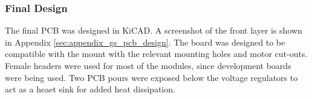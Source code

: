 \subsubsection{Final Design}
The final PCB was designed in KiCAD. A screenshot of the front layer is shown in Appendix \ref{sec:appendix_gs_pcb_design}. The board was designed to be compatible with the mount with the relevant mounting holes and motor cut-outs. Female headers were used for most of the modules, since development boards were being used. Two PCB pours were exposed below the voltage regulators to act as a heaet sink for added heat dissipation.